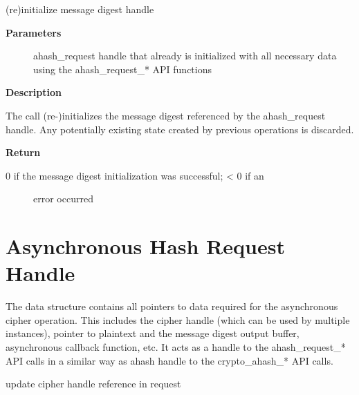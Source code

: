 \documentclass[a4paper,8pt,english]{sphinxmanual}
\begin{document}
\begin{fulllineitems}
\label{crypto/api-digest:c.crypto_ahash_init}
(re)initialize message digest handle

\end{fulllineitems}


\textbf{Parameters}
\begin{description}
\item[{}] \leavevmode
ahash\_request handle that already is initialized with all necessary
data using the ahash\_request\_* API functions

\end{description}

\textbf{Description}

The call (re-)initializes the message digest referenced by the ahash\_request
handle. Any potentially existing state created by previous operations is
discarded.

\textbf{Return}
\begin{description}
\item[{0 if the message digest initialization was successful; \textless{} 0 if an}] \leavevmode
error occurred

\end{description}


\section{Asynchronous Hash Request Handle}
\label{crypto/api-digest:asynchronous-hash-request-handle}
The  data structure contains all pointers to data
required for the asynchronous cipher operation. This includes the cipher
handle (which can be used by multiple  instances), pointer
to plaintext and the message digest output buffer, asynchronous callback
function, etc. It acts as a handle to the ahash\_request\_* API calls in a
similar way as ahash handle to the crypto\_ahash\_* API calls.

\begin{fulllineitems}
\label{crypto/api-digest:c.ahash_request_set_tfm}
update cipher handle reference in request

\end{fulllineitems}
\end{document}
